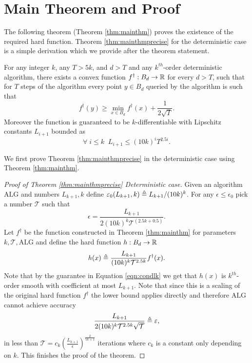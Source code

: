 \documentclass[final,12pt]{colt2018} %
\def\hardf{f^{\dagger}}
\def\alg{\mathrm{ALG}}
\begin{document}
\section{Main Theorem and Proof}
\label{sec:deterministic}
The following theorem (Theorem \ref{thm:mainthm}) proves the existence of the required hard function. Theorem \ref{thm:mainthmprecise} for the deterministic case is a simple derivation which we provide after the theorem statement.  

\begin{theorem}
\label{thm:mainthm}
  For any integer $k$, any $T > 5k$, and $d > T$ and any $k^{th}$-order deterministic algorithm, there exists a convex function $\hardf: B_d \rightarrow \reals$ for every $d > T$, such that for $T$ steps of the algorithm every point $y \in B_d$ queried by the algorithm is such that 
  \[\hardf(y) \geq \min_{x \in B_d}\hardf(x) + \frac{1}{2\sqrt{T}}.\] 
  Moreover the function is guaranteed to be $k$-differentiable with Lipschitz constants $L_{i+1}$ bounded as 
  \begin{equation}
  \label{eqn:condlk}
    \forall \;i \leq k \;\; L_{i+1} \leq (10k)^iT^{2.5i}.
  \end{equation}

\end{theorem}
We first prove Theorem \ref{thm:mainthmprecise} in the deterministic case using Theorem \ref{thm:mainthm}. 
\begin{proof}[Proof of Theorem \ref{thm:mainthmprecise} Deterministic case]
Given an algorithm $\alg$ and numbers $L_{k+1},k$ define $\varepsilon_0(L_{k+1},k) \triangleq L_{k+1}/(10k)^k$. For any $\epsilon \leq \epsilon_0$ pick a number $\mathcal{T}$ such that
\[\epsilon = \frac{L_{k+1}}{2(10k)^k\mathcal{T}^{(2.5k + 0.5)}}.\]
Let $\hardf$ be the function constructed in Theorem \ref{thm:mainthm} for parameters $k, \mathcal{T}, \alg$ and define the hard function $h:B_d \rightarrow {\mathbb R}$
\[ h(x) \defeq \frac{L_{k+1}}{(10k)^k\mathcal{T}^{2.5k}}\hardf(x).\]
Note that by the guarantee in Equation \eqref{eqn:condlk} we get that $h(x)$ is $k^{th}$-order smooth with coefficient at most $L_{k+1}$. Note that since this is a scaling of the original hard function $\hardf$ the lower bound applies directly and therefore $\alg$ cannot achieve accuracy 
\[ \frac{L_{k+1}}{2(10k)^k\mathcal{T}^{2.5k}\sqrt{\mathcal{T}}} \triangleq \varepsilon,\]
in less than $\mathcal{T} = c_{k}\left(\frac{L_{k+1}}{\epsilon}\right)^{\frac{2}{5k+1}}$ iterations where $c_k$ is a constant only depending on $k$. This finishes the proof of the theorem.  
\end{proof}
\end{document}
